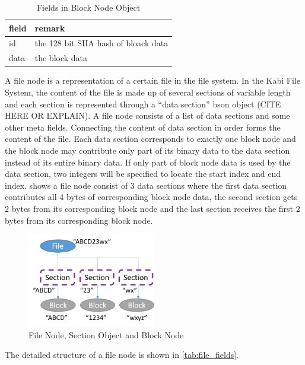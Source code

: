 \begin{table}
\caption{Fields in Block Node Object}
\label{tab:block_fields}
\begin{center}
\begin{tabular}{ll}
\toprule
field & remark\\
\midrule
id & the 128 bit SHA hash of bloack data\\
data & the block data\\
\bottomrule
\end{tabular}
\end{center}
\end{table}

    A file node is a representation of a certain file in the file system. In the Kabi File System, the content of the file is made up of several sections of variable length and each section is represented through a “data section” bson object (CITE HERE OR EXPLAIN). A file node consists of a list of data sections and some other meta fields. Connecting the content of data section in order forms the content of the file. Each data section corresponds to exactly one block node and the block node may contribute only part of its binary data to the data section instead of its entire binary data. If only part of block node data is used by the data section, two integers will be specified to locate the start index and end index.  shows a file node consist of 3 data sections where the first data section contributes all 4 bytes of corresponding block node data, the second section gets 2 bytes from its corresponding block node and the last section receives the first 2 bytes from its corresponding block node.

\begin{figure}[hbtp]
\centering
\includegraphics[width=0.5\textwidth]{Chapter-3/figs/fig7.png}
\caption{File Node, Section Object and Block Node}
\label{fig:file_and_section}
\end{figure}

	The detailed structure of a file node is shown in \ref{tab:file_fields}.

